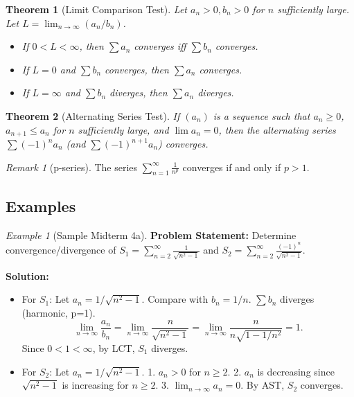 \documentclass{article}
\theoremstyle{definition}
\theoremstyle{plain}
\newtheorem{theorem}{Theorem}[section]
\theoremstyle{remark}
\newtheorem{example}{Example}[section]
\newtheorem{remark}{Remark}[section]
\begin{document}
\begin{theorem}[Limit Comparison Test{\cite[Thm 14.7]{Ross}}]
Let \(a_n > 0, b_n > 0\) for \(n\) sufficiently large. Let \(L = \lim_{n\to\infty} (a_n / b_n)\).
\begin{itemize}
    \item If \(0 < L < \infty\), then \(\sum a_n\) converges iff \(\sum b_n\) converges.
    \item If \(L = 0\) and \(\sum b_n\) converges, then \(\sum a_n\) converges.
    \item If \(L = \infty\) and \(\sum b_n\) diverges, then \(\sum a_n\) diverges.
\end{itemize}
\end{theorem}

\begin{theorem}[Alternating Series Test{\cite[Thm 15.3]{Ross}}]
If \((a_n)\) is a sequence such that \(a_n \ge 0\), \(a_{n+1} \le a_n\) for \(n\) sufficiently large, and \(\lim a_n = 0\), then the alternating series \(\sum (-1)^n a_n\) (and \(\sum (-1)^{n+1} a_n\)) converges.
\end{theorem}

\begin{remark}[p-series{\cite[Sec 14]{Ross}}]
The series \(\sum_{n=1}^\infty \frac{1}{n^p}\) converges if and only if \(p > 1\).
\end{remark}

\subsection{Examples}

\begin{example}[Sample Midterm 4a]
\textbf{Problem Statement:} Determine convergence/divergence of \(S_1 = \sum_{n=2}^\infty \frac{1}{\sqrt{n^2-1}}\) and \(S_2 = \sum_{n=2}^\infty \frac{(-1)^n}{\sqrt{n^2-1}}\).

\textbf{Solution:}
\begin{itemize}
    \item For \(S_1\): Let \(a_n = 1/\sqrt{n^2-1}\). Compare with \(b_n = 1/n\). \(\sum b_n\) diverges (harmonic, p=1).
    \[ \lim_{n\to\infty} \frac{a_n}{b_n} = \lim_{n\to\infty} \frac{n}{\sqrt{n^2-1}} = \lim_{n\to\infty} \frac{n}{n\sqrt{1-1/n^2}} = 1. \]
    Since \(0 < 1 < \infty\), by LCT, \(S_1\) diverges.
    \item For \(S_2\): Let \(a_n = 1/\sqrt{n^2-1}\).
        1. \(a_n > 0\) for \(n \ge 2\).
        2. \(a_n\) is decreasing since \(\sqrt{n^2-1}\) is increasing for \(n \ge 2\).
        3. \(\lim_{n\to\infty} a_n = 0\).
    By AST, \(S_2\) converges.
\end{itemize}
\end{example}
\end{document}
